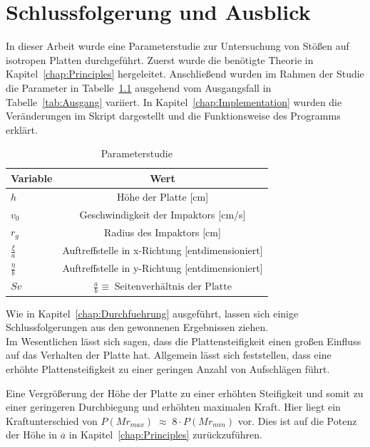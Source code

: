 \chapter{Schlussfolgerung und Ausblick}
\label{Conclusion}

In dieser Arbeit wurde eine Parameterstudie zur Untersuchung von Stößen auf isotropen Platten durchgeführt. Zuerst wurde die benötigte Theorie in Kapitel~\ref{chap:Principles} hergeleitet. Anschließend wurden im Rahmen der Studie die Parameter in Tabelle~\ref{tab:VariierteParams} ausgehend vom Ausgangsfall in Tabelle~\ref{tab:Ausgang} variiert. In Kapitel~\ref{chap:Implementation} wurden die Veränderungen im Skript dargestellt und die Funktionsweise des Programms erklärt. 

\begin{table}[H]
	\begin{center}
		\caption{Parameterstudie}
		\label{tab:VariierteParams}
		\begin{tabular}{l|c}
			\textbf{Variable} & \textbf{Wert}\\
			\hline
			$h$ & Höhe der Platte [cm]\\
			$v_{0}$ & Geschwindigkeit der Impaktors [cm/s]\\
			$r_{g}$ & Radius des Impaktors [cm]\\
			$\frac{\xi}{a}$ & Auftreffstelle in x-Richtung [entdimensioniert]\\
			$\frac{\eta}{b}$ & Auftreffstelle in y-Richtung [entdimensioniert]\\
			$Sv$ & $\frac{a}{b} \equiv \; \mbox{Seitenverhältnis der Platte}$ \\		
		\end{tabular}
	\end{center}
\end{table}

Wie in Kapitel~\ref{chap:Durchfuehrung} ausgeführt, lassen sich einige Schlussfolgerungen aus den gewonnenen Ergebnissen ziehen. \\

Im Wesentlichen lässt sich sagen, dass die Plattensteifigkeit einen großen Einfluss auf das Verhalten der Platte hat. Allgemein lässt sich feststellen, dass eine erhöhte Plattensteifigkeit zu einer geringen Anzahl von Aufschlägen führt.

Eine Vergrößerung der Höhe der Platte zu einer erhöhten Steifigkeit und somit zu einer geringeren Durchbiegung und erhöhten maximalen Kraft. Hier liegt ein Kraftunterschied von $P(Mr_{max}) \; \approx \; 8 \cdot P(Mr_{min})$ vor. Dies ist auf die Potenz der Höhe in $\overline{a}$ in Kapitel~\ref{chap:Principles} zurückzuführen.

